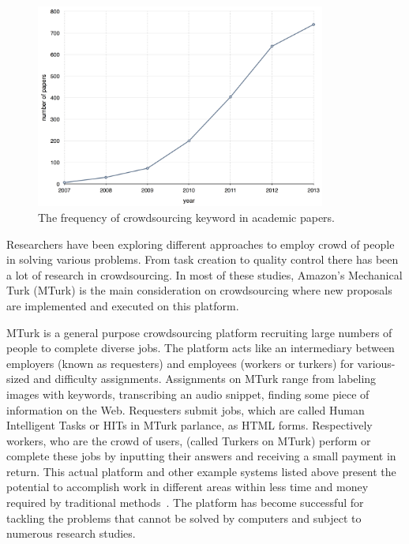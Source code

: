 \begin{figure}[ht]
	\centering
	\includegraphics[width=0.85\textwidth]{figures/keyword_statistics.png}
	\caption[The frequency of crowdsourcing keyword in academic papers.]{The frequency of crowdsourcing keyword in academic papers.\footnotemark}
	\label{fig:keywordstats}
\end{figure}

Researchers have been exploring different approaches to employ crowd of people 
in solving various problems. From task creation to quality control there has been a 
lot of research in crowdsourcing.  In most of these studies, Amazon's Mechanical 
Turk (MTurk) is the main consideration on crowdsourcing where new proposals are 
implemented and executed on this platform. 

MTurk is a general purpose crowdsourcing platform 
recruiting large numbers of people to complete diverse jobs. The platform acts like an 
intermediary between employers (known as requesters) 
and employees (workers or turkers) for various-sized and difficulty assignments.
Assignments on MTurk 
range from labeling images with keywords, transcribing an audio snippet, finding some 
piece of information on the Web. Requesters submit jobs, which are called Human 
Intelligent Tasks or HITs in MTurk parlance, as HTML forms. Respectively workers, 
who are the crowd of users, (called Turkers on MTurk) perform or complete these 
jobs by inputting their answers and receiving a small payment in return. This actual 
platform and other example systems listed above present the potential to accomplish 
work in different areas within less time and money required by traditional 
methods~\cite{Minder2012, Marcus2011}. The platform has become successful 
for tackling the problems that cannot be 
solved by computers and subject to numerous research studies.


